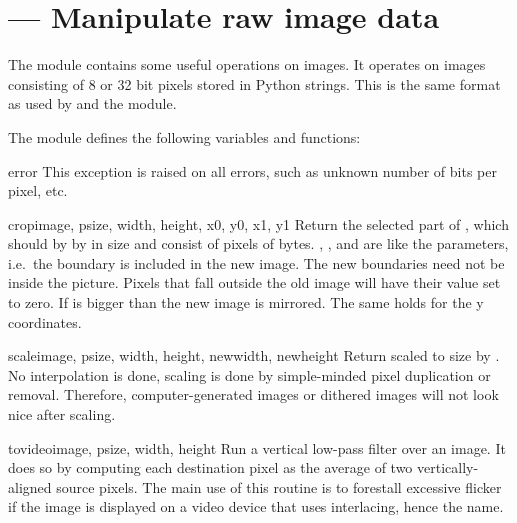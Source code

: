 \section{ ---
         Manipulate raw image data}



The  module contains some useful operations on images.
It operates on images consisting of 8 or 32 bit pixels stored in
Python strings.  This is the same format as used by
 and the  module.

The module defines the following variables and functions:

\begin{excdesc}{error}
This exception is raised on all errors, such as unknown number of bits
per pixel, etc.
\end{excdesc}


\begin{funcdesc}{crop}{image, psize, width, height, x0, y0, x1, y1}
Return the selected part of , which should by
 by  in size and consist of pixels of
 bytes. , ,  and  are like
the  parameters, i.e.\ the boundary is
included in the new image.  The new boundaries need not be inside the
picture.  Pixels that fall outside the old image will have their value
set to zero.  If  is bigger than  the new image is
mirrored.  The same holds for the y coordinates.
\end{funcdesc}

\begin{funcdesc}{scale}{image, psize, width, height, newwidth, newheight}
Return  scaled to size  by .
No interpolation is done, scaling is done by simple-minded pixel
duplication or removal.  Therefore, computer-generated images or
dithered images will not look nice after scaling.
\end{funcdesc}

\begin{funcdesc}{tovideo}{image, psize, width, height}
Run a vertical low-pass filter over an image.  It does so by computing
each destination pixel as the average of two vertically-aligned source
pixels.  The main use of this routine is to forestall excessive
flicker if the image is displayed on a video device that uses
interlacing, hence the name.
\end{funcdesc}

